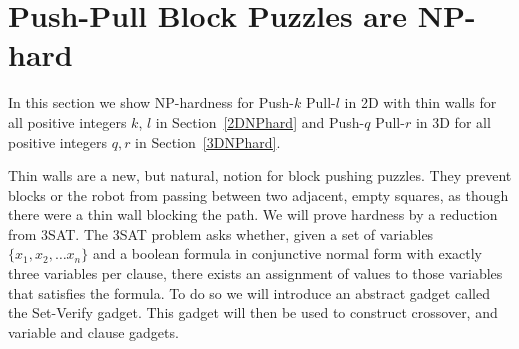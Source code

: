 
\section{Push-Pull Block Puzzles are NP-hard}
In this section we show NP-hardness for Push-$k$ Pull-$l$ in 2D with thin walls for all positive integers $k$, $l$ in Section~\ref{2DNPhard} and Push-$q$ Pull-$r$ in 3D for all positive integers $q, r$ in Section~\ref{3DNPhard}. 

 


Thin walls are a new, but natural, notion for block pushing puzzles. They prevent blocks or the robot from passing between two adjacent, empty squares, as though there were a thin wall blocking the path. We will prove hardness by a reduction from 3SAT. The 3SAT problem asks whether, given a set of variables $\{x_1, x_2, \ldots x_n\}$ and a boolean formula in conjunctive normal form with exactly three variables per clause, there exists an assignment of values to those variables that satisfies the formula\cite{NPBook}. To do so we will introduce an abstract gadget called the Set-Verify gadget. This gadget will then be used to construct crossover, and variable and clause gadgets.

